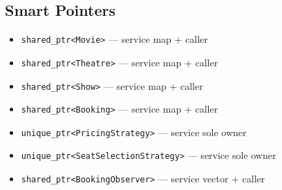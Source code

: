 \documentclass[11pt,a4paper]{article}
\begin{document}
\subsection{Smart Pointers}
\begin{itemize}
    \item \texttt{shared\_ptr<Movie>} --- service map + caller
    \item \texttt{shared\_ptr<Theatre>} --- service map + caller
    \item \texttt{shared\_ptr<Show>} --- service map + caller
    \item \texttt{shared\_ptr<Booking>} --- service map + caller
    \item \texttt{unique\_ptr<PricingStrategy>} --- service sole owner
    \item \texttt{unique\_ptr<SeatSelectionStrategy>} --- service sole owner
    \item \texttt{shared\_ptr<BookingObserver>} --- service vector + caller
\end{itemize}

\newpage
\end{document}
